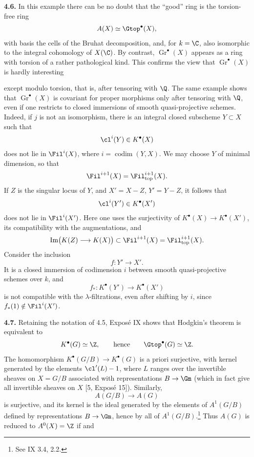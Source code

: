 \textbf{4.6.} In this example there can be no doubt that the ``good'' ring
is the torsion-free ring
\[
 A(X)\simeq\Gtop^\bullet(X),
\]
with basis the cells of the Bruhat decomposition, and, for $k=\C$, also
isomorphic to the integral cohomology of $X(\C)$. By contrast,
$\operatorname{Gr}^\bullet(X)$ appears as a ring with torsion of a rather
pathological kind. This confirms the view that
$\operatorname{Gr}^\bullet(X)$ is hardly interesting

except modulo torsion, that is, after tensoring with $\Q$. The same example
shows that $\operatorname{Gr}^\bullet(X)$ is covariant for proper morphisms
only after tensoring with $\Q$, even if one restricts to closed immersions
of smooth quasi-projective schemes. Indeed, if $j$ is not an isomorphism,
there is an integral closed subscheme $Y\subset X$ such that
\[
 \cl^i(Y)\in K^\bullet(X)
\]
does not lie in $\Fil^i(X)$, where $i=\operatorname{codim}(Y,X)$. We may
choose $Y$ of minimal dimension, so that
\[
 \Fil^{i+1}(X)=\Fil_{\mathrm{top}}^{i+1}(X).
\]
If $Z$ is the singular locus of $Y$, and $X'=X-Z$, $Y'=Y-Z$, it follows
that
\[
 \cl^i(Y')\in K^\bullet(X')
\]
does not lie in $\Fil^i(X')$. Here one uses the surjectivity of
$K^\bullet(X)\to K^\bullet(X')$, its compatibility with the augmentations,
and
\[
 \operatorname{Im}\bigl(K(Z)\longrightarrow K(X)\bigr)
 \subset\Fil^{i+1}(X)=\Fil_{\mathrm{top}}^{i+1}(X).
\]
Consider the inclusion
\[
 f:Y'\longrightarrow X'.
\]
It is a closed immersion of codimension $i$ between smooth
quasi-projective schemes over $k$, and
\[
 f_*:K^\bullet(Y')\longrightarrow K^\bullet(X')
\]
is not compatible with the $\lambda$-filtrations, even after shifting by
$i$, since $f_*(1)\notin\Fil^i(X')$.

\textbf{4.7.} Retaining the notation of 4.5, Exposé IX shows that Hodgkin's
theorem is equivalent to
\[
 K^\bullet(G)\simeq\Z,
 \qquad\text{hence}\qquad
 \Gtop^\bullet(G)\simeq\Z.
\]
The homomorphism $K^\bullet(G/B)\to K^\bullet(G)$ is a priori surjective,
with kernel generated by the elements $\cl'(L)-1$, where $L$ ranges over
the invertible sheaves on $X=G/B$ associated with representations
$B\to\Gm$ (which in fact give all invertible sheaves on $X$ [5,
Exposé 15]). Similarly,
\[
 A(G/B)\longrightarrow A(G)
\]
is surjective, and its kernel is the ideal generated by the elements of
$A^1(G/B)$ defined by representations $B\to\Gm$, hence by all of
$A^1(G/B)$.\footnote{See IX 3.4, 2.2.} Thus $A(G)$ is reduced to
$A^0(X)=\Z$ if and

